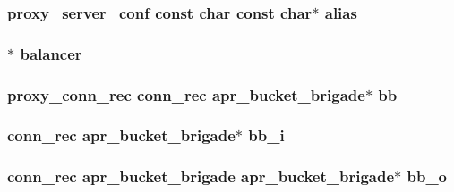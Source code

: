 \subsubsection[{\texorpdfstring{alias}{alias}}]{ {\bf proxy\+\_\+server\+\_\+conf} const char const char$\ast$ alias}\hypertarget{group__MOD__PROXY_ga7f4ea7c234f98eb8a540edb42cea1be0}{}\label{group__MOD__PROXY_ga7f4ea7c234f98eb8a540edb42cea1be0}
\subsubsection[{\texorpdfstring{balancer}{balancer}}]{ $\ast$ balancer}\hypertarget{group__MOD__PROXY_ga7d902f564a33cf9c787a5670b026737b}{}\label{group__MOD__PROXY_ga7d902f564a33cf9c787a5670b026737b}
\subsubsection[{\texorpdfstring{bb}{bb}}]{ {\bf proxy\+\_\+conn\+\_\+rec} {\bf conn\+\_\+rec} {\bf apr\+\_\+bucket\+\_\+brigade}$\ast$ bb}\hypertarget{group__MOD__PROXY_ga9313a8a2814cff280d5d780c723def3c}{}\label{group__MOD__PROXY_ga9313a8a2814cff280d5d780c723def3c}
\subsubsection[{\texorpdfstring{bb\+\_\+i}{bb_i}}]{ {\bf conn\+\_\+rec} {\bf apr\+\_\+bucket\+\_\+brigade}$\ast$ bb\+\_\+i}\hypertarget{group__MOD__PROXY_ga22cd7051b4d61af8a777447d7d65da65}{}\label{group__MOD__PROXY_ga22cd7051b4d61af8a777447d7d65da65}
\subsubsection[{\texorpdfstring{bb\+\_\+o}{bb_o}}]{ {\bf conn\+\_\+rec} {\bf apr\+\_\+bucket\+\_\+brigade} {\bf apr\+\_\+bucket\+\_\+brigade}$\ast$ bb\+\_\+o}\hypertarget{group__MOD__PROXY_gaaa1c682c0bcc62cfd334ed6e72e8840a}{}\label{group__MOD__PROXY_gaaa1c682c0bcc62cfd334ed6e72e8840a}
